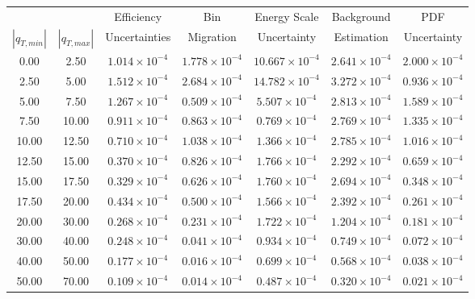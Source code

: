 \begin{tabular}{|c|c||c|c|c|c|c|}\hline
            &             & Efficiency &   Bin     & Energy Scale  & Background & PDF\\ 
$|q_{T,min}|$ & $|q_{T,max}|$ & Uncertainties & Migration & Uncertainty & Estimation & Uncertainty \\ \hline 
    0.00 &    2.50 & $1.014 \times 10^{-4}$ &  $1.778 \times 10^{-4}$ & $10.667 \times 10^{-4}$ & $2.641 \times 10^{-4}$ & $2.000 \times 10^{-4}$ \\ 
    2.50 &    5.00 & $1.512 \times 10^{-4}$ &  $2.684 \times 10^{-4}$ & $14.782 \times 10^{-4}$ & $3.272 \times 10^{-4}$ & $0.936 \times 10^{-4}$ \\ 
    5.00 &    7.50 & $1.267 \times 10^{-4}$ &  $0.509 \times 10^{-4}$ & $5.507 \times 10^{-4}$ & $2.813 \times 10^{-4}$ & $1.589 \times 10^{-4}$ \\ 
    7.50 &   10.00 & $0.911 \times 10^{-4}$ &  $0.863 \times 10^{-4}$ & $0.769 \times 10^{-4}$ & $2.769 \times 10^{-4}$ & $1.335 \times 10^{-4}$ \\ 
   10.00 &   12.50 & $0.710 \times 10^{-4}$ &  $1.038 \times 10^{-4}$ & $1.366 \times 10^{-4}$ & $2.785 \times 10^{-4}$ & $1.016 \times 10^{-4}$ \\ 
   12.50 &   15.00 & $0.370 \times 10^{-4}$ &  $0.826 \times 10^{-4}$ & $1.766 \times 10^{-4}$ & $2.292 \times 10^{-4}$ & $0.659 \times 10^{-4}$ \\ 
   15.00 &   17.50 & $0.329 \times 10^{-4}$ &  $0.626 \times 10^{-4}$ & $1.760 \times 10^{-4}$ & $2.694 \times 10^{-4}$ & $0.348 \times 10^{-4}$ \\ 
   17.50 &   20.00 & $0.434 \times 10^{-4}$ &  $0.500 \times 10^{-4}$ & $1.566 \times 10^{-4}$ & $2.392 \times 10^{-4}$ & $0.261 \times 10^{-4}$ \\ 
   20.00 &   30.00 & $0.268 \times 10^{-4}$ &  $0.231 \times 10^{-4}$ & $1.722 \times 10^{-4}$ & $1.204 \times 10^{-4}$ & $0.181 \times 10^{-4}$ \\ 
   30.00 &   40.00 & $0.248 \times 10^{-4}$ &  $0.041 \times 10^{-4}$ & $0.934 \times 10^{-4}$ & $0.749 \times 10^{-4}$ & $0.072 \times 10^{-4}$ \\ 
   40.00 &   50.00 & $0.177 \times 10^{-4}$ &  $0.016 \times 10^{-4}$ & $0.699 \times 10^{-4}$ & $0.568 \times 10^{-4}$ & $0.038 \times 10^{-4}$ \\ 
   50.00 &   70.00 & $0.109 \times 10^{-4}$ &  $0.014 \times 10^{-4}$ & $0.487 \times 10^{-4}$ & $0.320 \times 10^{-4}$ & $0.021 \times 10^{-4}$ \\ 

\end{tabular}
